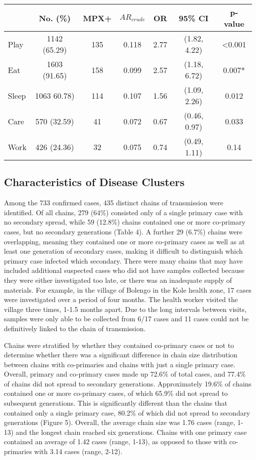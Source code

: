 \begin{table}
\begin{tabular}{lcccccc}
\toprule
& \textbf{No. (\%)} & \textbf{MPX+} & $AR_{crude}$ & \textbf{OR} & \textbf{95\% CI} & \textbf{p-value} \\
\midrule
Play & 1142 (65.29) & 135 & 0.118 & 2.77 & (1.82, 4.22) & \textless0.001 \\
Eat & 1603 (91.65) & 158 & 0.099 & 2.57 & (1.18, 6.72) & 0.007* \\
Sleep & 1063 60.78) & 114 & 0.107 & 1.56 & (1.09, 2.26) & 0.012 \\
Care & 570 (32.59) & 41 & 0.072 & 0.67 & (0.46, 0.97) & 0.033 \\
Work & 426 (24.36) & 32 & 0.075 & 0.74 & (0.49, 1.11) & 0.14 \\
\bottomrule
\end{tabular}
\end{table}


\subsection{Characteristics of Disease Clusters}
Among the 733 confirmed cases, 435 distinct chains of transmission were identified. Of all chains, 279 (64\%) consisted only of a single primary case with no secondary spread, while 59 (12.8\%) chains contained one or more co-primary cases, but no secondary generations (Table 4). A further 29 (6.7\%) chains were overlapping, meaning they contained one or more co-primary cases as well as at least one generation of secondary cases, making it difficult to distinguish which primary case infected which secondary. There were many chains that may have included additional suspected cases who did not have samples collected because they were either investigated too late, or there was an inadequate supply of materials. For example, in the village of Bolengo in the Kole health zone, 17 cases were investigated over a period of four months. The health worker visited the village three times, 1-1.5 months apart. Due to the long intervals between visits, samples were only able to be collected from 6/17 cases and 11 cases could not be definitively linked to the chain of transmission.

Chains were stratified by whether they contained co-primary cases or not to determine whether there was a significant difference in chain size distribution between chains with co-primaries and chains with just a single primary case. Overall, primary and co-primary cases made up 72.6\% of total cases, and 77.4\% of chains did not spread to secondary generations. Approximately 19.6\% of chains contained one or more co-primary cases, of which 65.9\% did not spread to subsequent generations. This is significantly different than the chains that contained only a single primary case, 80.2\% of which did not spread to secondary generations (Figure 5). Overall, the average chain size was 1.76 cases (range, 1-13) and the longest chain reached six generations. Chains with one primary case contained an average of 1.42 cases (range, 1-13), as opposed to those with co-primaries with 3.14 cases (range, 2-12). 

